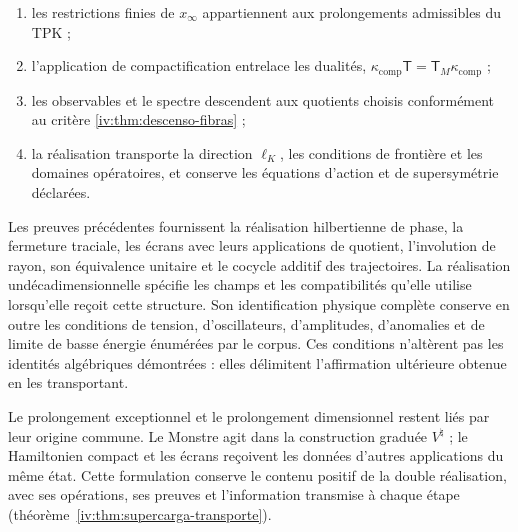 \begin{enumerate}
\item les restrictions finies de \(x_\infty\)
      appartiennent aux prolongements admissibles du TPK ;
\item l’application de compactification entrelace les dualités,
      \(\kappa_{\mathrm{comp}}\mathsf T
        =\mathsf T_M\kappa_{\mathrm{comp}}\) ;
\item les observables et le spectre descendent aux
      quotients choisis conformément au critère
      \ref{iv:thm:descenso-fibras} ;
\item la réalisation transporte la direction
      \(\ell_K\), les conditions de frontière et les
      domaines opératoires, et conserve les équations
      d’action et de supersymétrie déclarées.
\end{enumerate}

Les preuves précédentes fournissent la réalisation
hilbertienne de phase, la fermeture traciale, les écrans
avec leurs applications de quotient, l’involution de rayon,
son équivalence unitaire et le cocycle additif des
trajectoires. La réalisation undécadimensionnelle
spécifie les champs et les compatibilités qu’elle
utilise lorsqu’elle reçoit cette structure. Son identification
physique complète conserve en outre les conditions
de tension, d’oscillateurs, d’amplitudes, d’anomalies et de
limite de basse énergie énumérées par le corpus.
Ces conditions n’altèrent pas les identités
algébriques démontrées : elles délimitent l’affirmation
ultérieure obtenue en les transportant.


Le prolongement exceptionnel et le prolongement dimensionnel
restent liés par leur origine commune. Le
Monstre agit dans la construction graduée
\(V^\natural\) ; le Hamiltonien compact et les
écrans reçoivent les données d’autres applications du
même état. Cette formulation conserve le
contenu positif de la double réalisation,
avec ses opérations, ses preuves et l’information
transmise à chaque étape (théorème~\ref{iv:thm:supercarga-transporte}).
